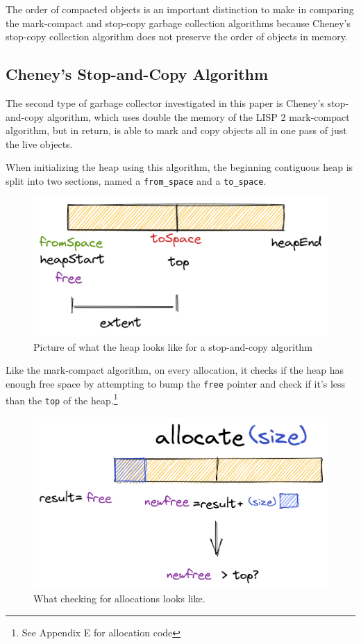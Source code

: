 \documentclass[index]{subfiles}
\begin{document}
The order of compacted objects is an important distinction to make in comparing the mark-compact and stop-copy garbage collection algorithms because Cheney's stop-copy collection algorithm does not preserve the order of objects in memory.

\subsection{Cheney's Stop-and-Copy Algorithm}

The second type of garbage collector investigated in this paper is Cheney's stop-and-copy algorithm, which uses double the memory of the LISP 2 mark-compact algorithm, but in return, is able to mark and copy objects all in one pass of just the live objects.

When initializing the heap using this algorithm, the beginning contiguous heap is split into two sections, named a \verb+from_space+ and a \verb+to_space+\cite[Chapter~2]{gc_handbook}.

\begin{figure}[H]
    \centering
    \includegraphics[scale=0.3]{pics/split-heap-diagram.png}
    \caption{Picture of what the heap looks like for a stop-and-copy algorithm}
\end{figure}

Like the mark-compact algorithm, on every allocation, it checks if the heap has enough free space by attempting to bump the \verb+free+ pointer and check if it's less than the \verb+top+ of the heap.\footnote{See Appendix E for allocation code}

\begin{figure}[H]
    \centering
    \includegraphics[scale=0.3]{pics/allocation.png}
    \caption{What checking for allocations looks like.}
\end{figure}
\end{document}
